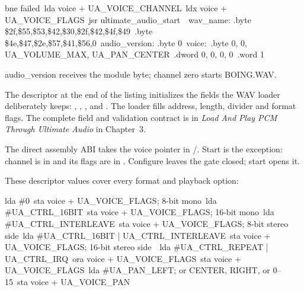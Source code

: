 \begin{listingbox}
\hspace*{2em}bne failed\
\hspace*{2em}lda voice + UA\_VOICE\_CHANNEL\
\hspace*{2em}ldx voice + UA\_VOICE\_FLAGS\
\hspace*{2em}jsr ultimate\_audio\_start\
\
wav\_name: .byte \$2f,\$55,\$53,\$42,\$30,\$2f,\$42,\$4f,\$49\
\hspace*{6em}.byte \$4e,\$47,\$2e,\$57,\$41,\$56,0\
audio\_version: .byte 0\
voice:\
\hspace*{2em}.byte 0, 0, UA\_VOLUME\_MAX, UA\_PAN\_CENTER\
\hspace*{2em}.dword 0, 0, 0, 0\
\hspace*{2em}.word 1
\end{listingbox}

\begin{resultbox}
audio_version receives the module byte; channel zero starts BOING.WAV.
\end{resultbox}

The descriptor at the end of the listing initializes the fields the WAV loader
deliberately keeps: , , ,
\cmd{repeat\_a} and \cmd{repeat\_b}. The loader fills address, length, divider
and format flags. The complete field and validation contract is in \emph{Load
And Play PCM Through Ultimate Audio} in Chapter~3.

The direct assembly ABI takes the voice pointer in /. Start is
the exception: channel is in  and its  flags are in
\cmd{X}. Configure leaves the gate closed; start opens it.

These descriptor values cover every format and playback option:

\begin{listingbox}
\hspace*{2em}lda \#0\
\hspace*{2em}sta voice + UA\_VOICE\_FLAGS\hspace{1em}; 8-bit mono\
\hspace*{2em}lda \#UA\_CTRL\_16BIT\
\hspace*{2em}sta voice + UA\_VOICE\_FLAGS\hspace{1em}; 16-bit mono\
\hspace*{2em}lda \#UA\_CTRL\_INTERLEAVE\
\hspace*{2em}sta voice + UA\_VOICE\_FLAGS\hspace{1em}; 8-bit stereo side\
\hspace*{2em}lda \#UA\_CTRL\_16BIT | UA\_CTRL\_INTERLEAVE\
\hspace*{2em}sta voice + UA\_VOICE\_FLAGS\hspace{1em}; 16-bit stereo side\
\
\hspace*{2em}lda \#UA\_CTRL\_REPEAT | UA\_CTRL\_IRQ\
\hspace*{2em}ora voice + UA\_VOICE\_FLAGS\
\hspace*{2em}sta voice + UA\_VOICE\_FLAGS\
\hspace*{2em}lda \#UA\_PAN\_LEFT\hspace{2em}; or CENTER, RIGHT, or 0--15\
\hspace*{2em}sta voice + UA\_VOICE\_PAN
\end{listingbox}

